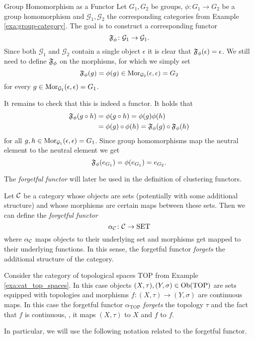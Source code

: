 \begin{example}{Group Homomorphism as a Functor}{}
Let $G_1, G_2$ be groups, $\phi\colon G_1 \to G_2$ be a group homomorphism and $\mathcal{G}_1,\mathcal{G}_2$ the corresponding categories from Example \ref{exa:group-category}. The goal is to construct a corresponding functor 
$$
\mathfrak{F}_\phi\colon \mathcal{G}_1 \to \mathcal{G}_1.
$$
Since both $\mathcal{G}_1$ and $\mathcal{G}_2$ contain a single object $\epsilon$ it is clear that $\mathfrak{F}_\phi(\epsilon) = \epsilon$. We still need to define $\mathfrak{F}_\phi$ on the morphisms, for which we simply set
$$
\mathfrak{F}_\phi(g) = \phi(g) \in \mathrm {Mor}_{\mathcal{G}_2}(\epsilon, \epsilon) = G_2
$$
for every $g \in \mathrm {Mor}_{\mathcal{G}_1}(\epsilon, \epsilon) = G_1$. \par

\medskip It remains to check that this is indeed a functor. It holds that
\begin{equation*}
\begin{split}
\mathfrak{F}_\phi(g \circ h) &= \phi(g \circ h) = \phi(g)\phi(h) \\
&= \phi(g) \circ \phi(h) = \mathfrak{F}_\phi(g) \circ \mathfrak{F}_\phi(h)
\end{split}
\end{equation*}
for all $g,h \in \mathrm {Mor}_{\mathcal{G}_1}(\epsilon, \epsilon) = G_1$. Since group homomorphisms map the neutral element to the neutral element we get
\begin{equation*}
\mathfrak{F}_\phi(e_{G_1}) = \phi(e_{G_1}) = e_{G_2}.
\end{equation*}
\end{example}

The \emph{forgetful functor} will later be used in the definition of clustering functors.

\begin{definition}{\cite[Chap.~1~Ex.~10]{Roman2017}}{}
Let $\mathcal{C}$ be a category whose objects are sets (potentially with some additional structure) and whose morphisms are certain maps between these sets. Then we can define the \emph{forgetful functor}
$$
\alpha_{\mathcal{C}}\colon \mathcal{C} \to \mathrm{SET}
$$
where $\alpha_{\mathcal{C}}$ maps objects to their underlying set and morphisms get mapped to their underlying functions. In this sense, the forgetful functor \emph{forgets} the additional structure of the category.
\end{definition}

\begin{example}{}{}
Consider the category of topological spaces $\mathrm{TOP}$ from Example \ref{exa:cat_top_spaces}. In this case objects $(X,\tau), (Y,\sigma) \in \mathrm {Ob}(\mathrm{TOP})$ are sets equipped with topologies and morphisms $f\colon (X,\tau) \to (Y,\sigma)$ are continuous maps.
In this case the forgetful functor $\alpha_{\mathrm{TOP}}$ \emph{forgets} the topology $\tau$ and the fact that $f$ is continuous, \ie, it maps $(X,\tau)$ to $X$ and $f$ to $f$.
\end{example}
In particular, we will use the following notation related to the forgetful functor.

